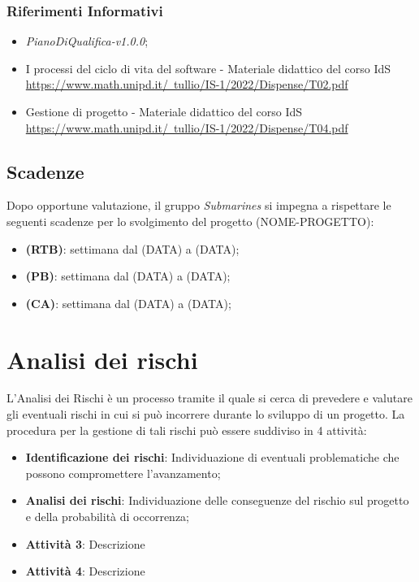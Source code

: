 \subsubsection{Riferimenti Informativi} %
\begin{itemize}
    \item \emph{PianoDiQualifica-v1.0.0};
    \item I processi del ciclo di vita del software - Materiale didattico del corso IdS \\ \href{https://www.math.unipd.it/~tullio/IS-1/2022/Dispense/T02.pdf}{\color{blue}https://www.math.unipd.it/~tullio/IS-1/2022/Dispense/T02.pdf}
    \item Gestione di progetto - Materiale didattico del corso IdS \\ \href{https://www.math.unipd.it/~tullio/IS-1/2022/Dispense/T04.pdf}{\color{blue}https://www.math.unipd.it/~tullio/IS-1/2022/Dispense/T04.pdf}
\end{itemize}

\subsection{Scadenze}
Dopo opportune valutazione, il gruppo \emph{Submarines} si impegna a rispettare le seguenti scadenze per lo svolgimento del progetto (NOME-PROGETTO):
\begin{itemize}
    \item \textbf{\RTB{} (RTB)}: settimana dal (DATA) a (DATA);
    \item \textbf{\PB{} (PB)}: settimana dal (DATA) a (DATA);
    \item \textbf{\CA{} (CA)}: settimana dal (DATA) a (DATA);
\end{itemize}

\section{Analisi dei rischi}
L'Analisi dei Rischi è un processo tramite il quale si cerca di prevedere e valutare gli eventuali rischi in cui si può
incorrere durante lo sviluppo di un progetto. La procedura per la gestione di tali rischi può essere suddiviso in 4 attività:
\begin{itemize}
    \item \textbf{Identificazione dei rischi}: Individuazione di eventuali problematiche che possono compromettere l'avanzamento;
    \item \textbf{Analisi dei rischi}: Individuazione delle conseguenze del rischio sul progetto e della probabilità di occorrenza;
    \item \textbf{Attività 3}: Descrizione
    \item \textbf{Attività 4}: Descrizione
\end{itemize}

